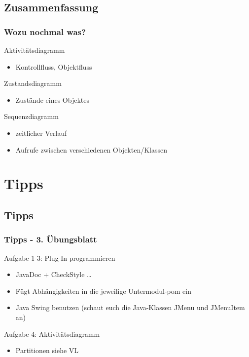 \documentclass[18pt]{beamer}
\begin{document}
	\subsection{Zusammenfassung}
	\begin{frame}
		\frametitle{Wozu nochmal was?}
		\begin{block}{Aktivitätsdiagramm}
			\begin{itemize}
				\item Kontrollfluss, Objektfluss
			\end{itemize}
		\end{block}
	\pause
	\begin{block}{Zustandsdiagramm}
		\begin{itemize}
			\item Zustände eines Objektes
		\end{itemize}
	\end{block}
	\pause
	\begin{block}{Sequenzdiagramm}
		\begin{itemize}
			\item zeitlicher Verlauf
			\item Aufrufe zwischen verschiedenen Objekten/Klassen
		\end{itemize}
	\end{block}
\end{frame}

\section{Tipps}
	\subsection{Tipps}
	\begin{frame}
		\frametitle{Tipps - 3. Übungsblatt}
			\begin{exampleblock}{Aufgabe 1-3: Plug-In programmieren}
				\begin{itemize}
					\pause
					\item JavaDoc + CheckStyle \dots \pause
					\item Fügt Abhängigkeiten in die jeweilige Untermodul-pom ein \pause
					\item Java Swing benutzen (schaut euch die Java-Klassen JMenu und JMenuItem an)
				\end{itemize}
			\end{exampleblock}
			\pause
			\begin{exampleblock}{Aufgabe 4: Aktivitätsdiagramm}
				\begin{itemize}
					\item Partitionen siehe VL
				\end{itemize}
			\end{exampleblock}
	\end{frame}
\end{document}
